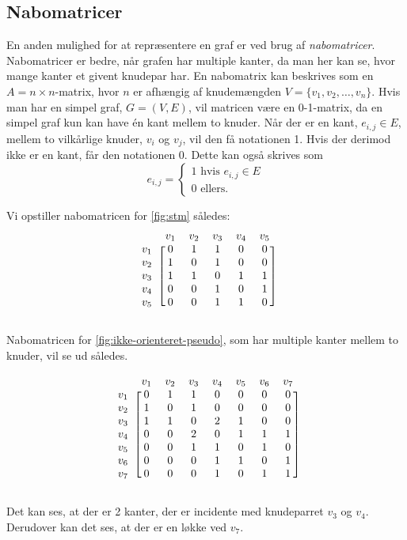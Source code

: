 \subsection{Nabomatricer}
En anden mulighed for at repræsentere en graf er ved brug af \emph{nabomatricer}. Nabomatricer er bedre, når grafen har multiple kanter, da man her kan se, hvor mange kanter et givent knudepar har.
En nabomatrix kan beskrives som en $A=n \times n$-matrix, hvor $n$ er afhængig af knudemængden $V=\{v_1, v_2, \dotsc, v_n\}$. Hvis man har en simpel graf, $G=(V,E)$, vil matricen være en 0-1-matrix, da en simpel graf kun kan have én kant mellem to knuder. Når der er en kant, $e_{i,j} \in E$, mellem to vilkårlige knuder, $v_i$ og $v_j$,  vil den få notationen 1. Hvis der derimod ikke er en kant, får den notationen 0.
Dette kan også skrives som
\begin{equation}
	e_{i,j} =	
	\begin{cases}
		1 \mbox{ hvis } e_{i,j} \in E \\
		0 \mbox{ ellers}.
	\end{cases}
\end{equation}



Vi opstiller nabomatricen for \autoref{fig:stm} således:
\begin{equation} \label{mat:nabo1}
\begin{blockarray}{rccccc}
		&v_1&v_2&v_3&v_4&v_5 \\
\begin{block}{r[ccccc]}
		v_1&0&1&1&0&0 \\
		v_2&1&0&1&0&0 \\
		v_3&1&1&0&1&1 \\
		v_4&0&0&1&0&1 \\
		v_5&0&0&1&1&0 \\
\end{block}
\end{blockarray}
\end{equation}

Nabomatricen for \autoref{fig:ikke-orienteret-pseudo}, som har multiple kanter mellem to knuder, vil se ud således.

\begin{equation}
\begin{blockarray}{rccccccc}
	&v_1&v_2&v_3&v_4&v_5&v_6&v_7 \\
\begin{block}{r[ccccccc]}
	v_1&0&1&1&0&0&0&0 \\
	v_2&1&0&1&0&0&0&0 \\
	v_3&1&1&0&2&1&0&0 \\
	v_4&0&0&2&0&1&1&1 \\
	v_5&0&0&1&1&0&1&0 \\
	v_6&0&0&0&1&1&0&1 \\
	v_7&0&0&0&1&0&1&1 \\
\end{block}
\end{blockarray}	
\end{equation}

Det kan ses, at der er 2 kanter, der er incidente med knudeparret $v_3$ og $v_4$. Derudover kan det ses, at der er en løkke ved $v_7$.

